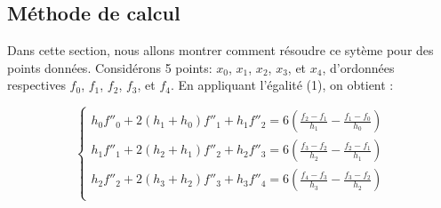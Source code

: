 \documentclass{article}
\begin{document}
\newpage
\subsection{M\'ethode de calcul}

Dans cette section, nous allons montrer comment r\'{e}soudre ce syt\`{e}me pour des points donn\'{e}es.
Consid\'{e}rons 5 points:  $x_0$, $x_1$, $x_2$, $x_3$, et $x_4$, d'ordonn\'{e}es respectives $f_0$, $f_1$, $f_2$, $f_3$, et $f_4$. En appliquant l'\'{e}galit\'{e} (1), on obtient :

\[\left\{\begin{array}{ll}h_0f''_0+2(h_1+h_0)f''_1+h_1f''_2=6(\frac{f_{2}-f_1}{h_1}-\frac{f_1-f_{0}}{h_{0}})\\
h_1f''_1+2(h_2+h_1)f''_2+h_2f''_3=6(\frac{f_{3}-f_2}{h_2}-\frac{f_2-f_{1}}{h_{1}})\\
h_2f''_2+2(h_3+h_2)f''_3+h_3f''_4=6(\frac{f_{4}-f_3}{h_3}-\frac{f_3-f_{2}}{h_{2}})\\
\end{array}\right. \]
\end{document}
